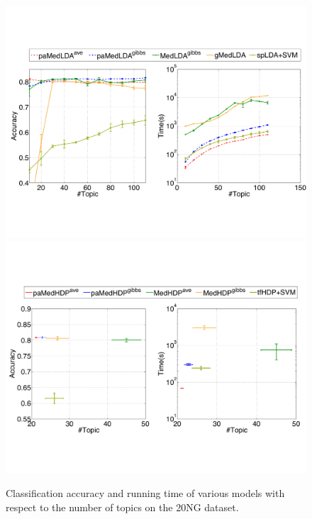 \documentclass[twoside,11pt]{article}
\newcommand{\strin}[1]{\todo[size=\small, color=green!40]{\bf\sf  #1}}
\begin{document}
\begin{figure}[t]
\centering
\includegraphics[width = .95\textwidth]{plot_acc_topic_multic_lda.pdf}
\includegraphics[width = .95\textwidth]{plot_acc_topic_multic_hdp.pdf}\vspace*{-.2cm}
\caption{Classification accuracy and running time of various models with respect to the number of topics on the 20NG dataset.}\vspace*{-0.3cm}
\label{fg:multic_topic_lda}
\end{figure}
\end{document}
